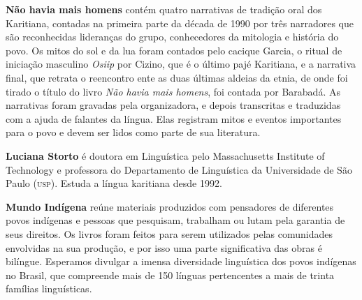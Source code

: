 \textbf{Não havia mais homens} contém quatro narrativas de tradição oral dos Karitiana, contadas na primeira parte da década de 1990 por três narradores que são reconhecidas lideranças do grupo, conhecedores da mitologia e história do povo. Os mitos do sol e da lua foram contados pelo cacique Garcia, o ritual de iniciação masculino \textit{Osiip} por Cizino, que é o último pajé Karitiana, e a narrativa final, que retrata o reencontro ente as duas últimas aldeias da etnia, de onde foi tirado o título do livro \textit{Não havia mais homens}, foi contada por Barabadá. As narrativas foram gravadas pela organizadora, e depois transcritas e traduzidas com a ajuda de falantes da língua. Elas registram mitos e eventos importantes para o povo e devem ser lidos como parte de sua literatura. 

\textbf{Luciana Storto} é doutora em Linguística pelo Massachusetts Institute of
Technology e professora do Departamento de Linguística da Universidade
de São Paulo (\textsc{usp}). Estuda a língua karitiana desde 1992.

\textbf{Mundo Indígena} reúne materiais produzidos com pensadores de diferentes povos indígenas e pessoas que pesquisam, trabalham ou lutam pela garantia de seus direitos. Os livros foram feitos para serem utilizados pelas comunidades envolvidas na sua produção, e por isso uma parte significativa das obras é bilíngue. Esperamos divulgar a imensa diversidade linguística dos povos indígenas no Brasil, que compreende mais de 150 línguas pertencentes a mais de trinta famílias linguísticas.

